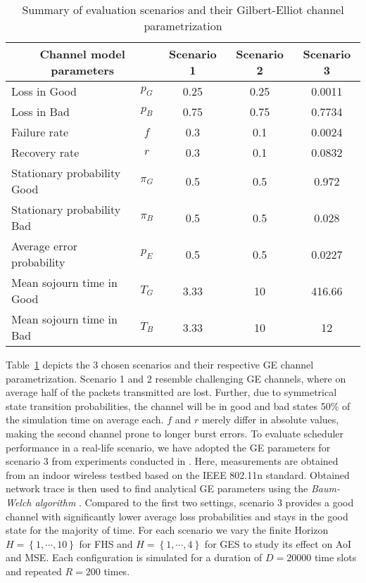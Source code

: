 \begin{table}[htb]
  \begin{center}
  \begin{tabular}{|lc|c|c|c|} 
  \hline
  \multicolumn{2}{|c|}{\textbf{Channel model parameters}} & \textbf{Scenario 1} & \textbf{Scenario 2} & \textbf{Scenario 3} \\
  \hline \hline
  Loss in Good & $p_G$ & 0.25 & 0.25 & 0.0011 \\ 
  Loss in Bad & $p_B$ & 0.75 & 0.75 &  0.7734 \\ 
  Failure rate & $f$ & 0.3 & 0.1 & 0.0024 \\ 
  Recovery rate & $r$ & 0.3 & 0.1 & 0.0832 \\
  \hline
  Stationary probability Good & $\pi_G$ & 0.5 & 0.5 & 0.972 \\
  Stationary probability Bad & $\pi_B$ & 0.5 & 0.5 & 0.028 \\
  Average error probability & $p_E$ & 0.5 & 0.5 & 0.0227 \\
  Mean sojourn time in Good & $T_G$ & 3.33 & 10 & 416.66 \\
  Mean sojourn time in Bad & $T_B$ & 3.33 & 10 & 12 \\
  \hline
  \end{tabular}
  \end{center}
  \caption{Summary of evaluation scenarios and their Gilbert-Elliot channel parametrization}
  \label{tab:scenarios}
\end{table}

Table~\ref{tab:scenarios} depicts the 3 chosen scenarios and their respective GE
channel parametrization. Scenario 1 and 2 resemble challenging GE channels,
where on average half of the packets transmitted are lost. Further, due to
symmetrical state transition probabilities, the channel will be in good and bad
states 50\% of the simulation time on average each. $f$ and $r$ merely differ in
absolute values, making the second channel prone to longer burst errors. To
evaluate scheduler performance in a real-life scenario, we have adopted the GE
parameters for scenario 3 from experiments conducted in
\cite{frohn2011analyzing}. Here, measurements are obtained from an indoor
wireless testbed based on the IEEE 802.11n standard. Obtained network trace is
then used to find analytical GE parameters using the \textit{Baum-Welch
algorithm} \cite{baum1970maximization}. Compared to the first two settings,
scenario 3 provides a good channel with significantly lower average loss
probabilities and stays in the good state for the majority of time. For each
scenario we vary the finite Horizon $H=\left\{ 1, \cdots, 10\right\}$ for FHS
and $H=\left\{ 1, \cdots, 4\right\}$ for GES to study its effect on AoI and MSE.
Each configuration is simulated for a duration of $D=20000$ time slots and
repeated $R=200$ times. 

